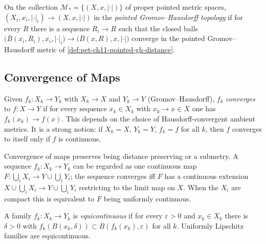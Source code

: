 \begin{definition}
  \label{def:pet-ch11-pointed-gh-topology}
  On the collection $\mathcal{M}_*=\{(X,x,|\cdot|)\}$ of proper pointed
  metric spaces, $(X_i,x_i,|\cdot|_i)\to(X,x,|\cdot|)$ in the \emph{pointed
  Gromov--Hausdorff topology} if for every $R$ there is a sequence $R_i\to R$
  such that the closed balls
  $\big(\overline{B}(x_i,R_i),x_i,|\cdot|_i\big)\to\big(\overline{B}(x,R),x,|\cdot|\big)$
  converge in the pointed Gromov--Hausdorff metric of
  \cref{def:pet-ch11-pointed-gh-distance}.
\end{definition}

\subsection{Convergence of Maps}

\begin{definition}
  \label{def:pet-ch11-convergence-of-maps}
  Given $f_k:X_k\to Y_k$ with $X_k\to X$ and $Y_k\to Y$ (Gromov--Hausdorff),
  $f_k$ \emph{converges} to $f:X\to Y$ if for every sequence $x_k\in X_k$
  with $x_k\to x\in X$ one has $f_k(x_k)\to f(x)$. This depends on the choice
  of Hausdorff-convergent ambient metrics. It is a strong notion: if
  $X_k=X$, $Y_k=Y$, $f_k=f$ for all $k$, then $f$ converges to itself only if
  $f$ is continuous.
\end{definition}

\begin{remark}
  \label{rem:pet-ch11-map-convergence-as-extension}
  Convergence of maps preserves being distance preserving or a submetry. A
  sequence $f_k:X_k\to Y_k$ can be regarded as one continuous map
  $F:\bigcup_iX_i\to Y\cup\bigcup_iY_i$; the sequence converges iff $F$ has a
  continuous extension $X\cup\bigcup_iX_i\to Y\cup\bigcup_iY_i$ restricting to
  the limit map on $X$. When the $X_i$ are compact this is equivalent to $F$
  being uniformly continuous.
\end{remark}

\begin{definition}
  \label{def:pet-ch11-equicontinuous-family}
  A family $f_k:X_k\to Y_k$ is \emph{equicontinuous} if for every
  $\varepsilon>0$ and $x_k\in X_k$ there is $\delta>0$ with
  $f_k(B(x_k,\delta))\subset B(f_k(x_k),\varepsilon)$ for all $k$. Uniformly
  Lipschitz families are equicontinuous.
\end{definition}

